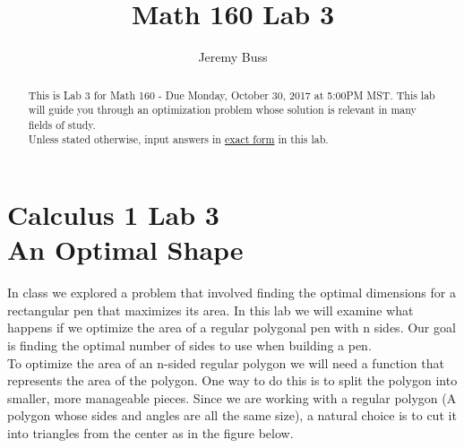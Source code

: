 \documentclass[handout,nooutcomes]{ximera}
\title{Math 160 Lab 3}
\author{Jeremy Buss} %
\begin{document}
\section{Calculus 1 Lab 3 \\ An Optimal Shape}

\begin{abstract}
This is Lab 3 for Math 160 - Due Monday, October 30, 2017 at 5:00PM MST.
This lab will guide you through an optimization problem whose solution is relevant in many fields of study.\\

Unless stated otherwise, input answers in \underline{exact form} in this lab.
\end{abstract}

\maketitle

\hspace{2cm}In class we explored a problem that involved finding the optimal dimensions for a rectangular pen that maximizes its area. In this lab we will examine what happens if we optimize the area of a regular polygonal pen with n sides. Our goal is finding the optimal number of sides to use when building a pen.\\

\medskip
\hspace{2cm}To optimize the area of an n-sided regular polygon we will need a function that represents the area of the polygon. One way to do this is to split the polygon into smaller, more manageable pieces. Since we are working with a regular polygon (A polygon whose sides and angles are all the same size), a natural choice is to cut it into triangles from the center as in the figure below.

\end{document}
